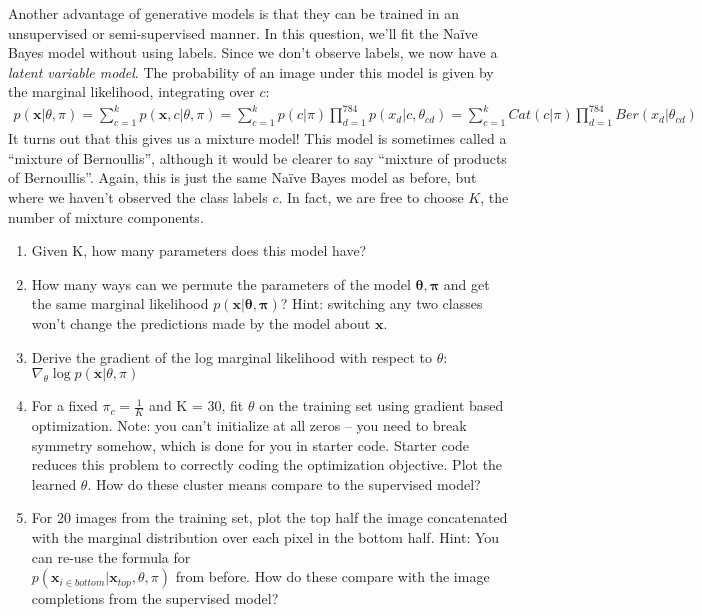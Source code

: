 \documentclass{harvardml}
\newcommand{\bx}{\mathbf{x}}
\newcommand{\btheta}{\boldsymbol{\theta}}
\newcommand{\bpi}{\boldsymbol{\pi}}
\theoremstyle{plain}
\begin{document}
\begin{problem}

Another advantage of generative models is that they can be trained in an unsupervised or semi-supervised manner.  In this question, we'll fit the Na\"ive Bayes model without using labels.  Since we don't observe labels, we now have a \emph{latent variable model}.  The probability of an image under this model is given by the marginal likelihood, integrating over $c$:
\begin{align}
p(\bx | \theta, \pi) = \sum_{c=1}^k p(\bx, c | \theta, \pi) = \sum_{c=1}^k p(c | \pi) \prod_{d=1}^{784} p( x_d | c, \theta_{cd}) = \sum_{c=1}^k Cat(c | \pi) \prod_{d=1}^{784} Ber(x_d | \theta_{cd})
\end{align}
It turns out that this gives us a mixture model! This model is sometimes called a ``mixture of Bernoullis'', although it would be clearer to say ``mixture of products of Bernoullis''.  Again, this is just the same Na\"ive Bayes model as before, but where we haven't observed the class labels $c$.  In fact, we are free to choose $K$, the number of mixture components.
\begin{enumerate}[label=(\alph*)]
\item Given K, how many parameters does this model have?
\item How many ways can we permute the parameters of the model $\btheta, \bpi$ and get the same marginal likelihood $p(\bx | \btheta, \bpi)$? Hint: switching any two classes won't change the predictions made by the model about $\bx$.
\item Derive the gradient of the log marginal likelihood with respect to $\theta$: $\nabla_\theta \log p(\bx | \theta, \pi)$
\item For a fixed $\pi_c = \frac{1}{K}$ and K = 30, fit $\theta$ on the training set using gradient based optimization.  Note: you can't initialize at all zeros -- you need to break symmetry somehow, which is done for you in starter code. Starter code reduces this problem to correctly coding the optimization objective. Plot the learned $\theta$.  How do these cluster means compare to the supervised model?
\item For 20 images from the training set, plot the top half the image concatenated with the marginal distribution over each pixel in the bottom half.
Hint: You can re-use the formula for \\ $p(\bx_{i \in bottom}|\bx_{top}, \theta, \pi)$ from before.  How do these compare with the image completions from the supervised model?
\end{enumerate}
\end{problem}



\end{document}

